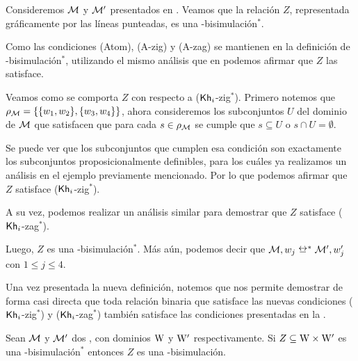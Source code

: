 \begin{ejemplo}\label{ejemplo:bisim^*}
    Consideremos $\mathcal{M}$ y $\mathcal{M}'$ presentados en . Veamos que la relación $Z$, representada 
    gráficamente por las líneas punteadas, es una \KHilogic-bisimulación$^*$. 

    Como las condiciones (Atom), (A-zig) y (A-zag) se mantienen en la definición de \KHilogic-bisimulación$^*$, utilizando el mismo 
    análisis que en  podemos afirmar que $Z$ las satisface.

    Veamos como se comporta $Z$ con respecto a ($\mathsf{Kh}_i$-zig$^*$). Primero notemos que $\rho_{\mathcal{M}} = \{\{w_1,w_2\}, \{w_3,w_4\}\}$, ahora 
    consideremos los subconjuntos $U$ del dominio de $\mathcal{M}$ que satisfacen que para cada $s \in \rho_{\mathcal{M}}$ se cumple que 
    $s \subseteq U$ o $s \cap U = \emptyset$. 
    
    Se puede ver que los subconjuntos que cumplen esa condición son exactamente los subconjuntos 
    proposicionalmente definibles, para los cuáles ya realizamos un análisis en el ejemplo previamente mencionado. 
    Por lo que podemos afirmar que $Z$ satisface ($\mathsf{Kh}_i$-zig$^*$).
    
    A su vez, podemos realizar un análisis similar para demostrar que $Z$ satisface ($\mathsf{Kh}_i$-zag$^*$). 

    Luego, $Z$ es una \KHilogic-bisimulación$^*$. Más aún, podemos decir que $\modults,w_j \bisim^* \modults',w_j'$ con $1 \leq j \leq 4$.
\end{ejemplo}


Una vez presentada la nueva definición, notemos que  nos permite demostrar de forma casi directa que
toda relación binaria que satisface las nuevas condiciones ($\mathsf{Kh}_i$-zig$^*$) y ($\mathsf{Kh}_i$-zag$^*$) también satisface las condiciones
presentadas en la .

\begin{lema}\label{lema:new-implies-old}
    Sean $\mathcal{M}$ y $\mathcal{M}'$ dos \ultss, con dominios $\mathrm{W}$ y $\mathrm{W}'$ respectivamente. Si $Z \subseteq \mathrm{W} \times \mathrm{W}'$ es una \KHilogic-bisimulación$^*$ entonces $Z$ es una \KHilogic-bisimulación.
\end{lema}

